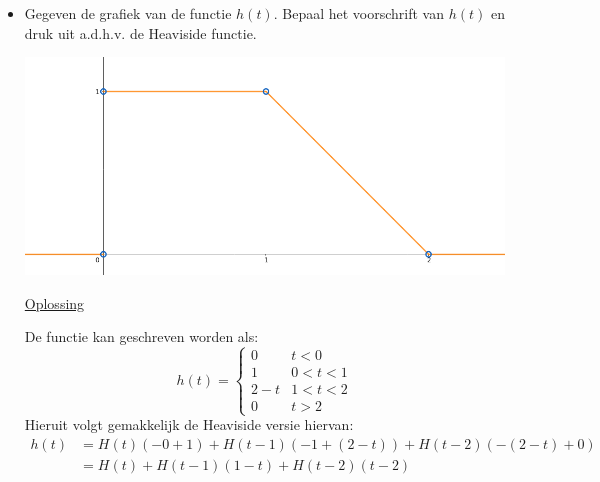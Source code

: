 \documentclass[12pt]{report}
\newcommand{\exercise}[2]{
  #1
  

  \underline{Oplossing}
  
  #2
  
  \hrulefill
}
\begin{document}
\begin{itemize}[label={}]
\item \exercise{Gegeven de grafiek van de functie $h(t)$. Bepaal het voorschrift van $h(t)$ en druk uit a.d.h.v. de Heaviside functie.
\begin{center}
 \includegraphics[width=\textwidth]{oef3_heaviside}
\end{center}}{
De functie kan geschreven worden als:
$$h(t) = \begin{cases}
          0 & t < 0 \\
          1 & 0 < t < 1 \\
          2 - t & 1 < t < 2 \\
          0 & t > 2
         \end{cases}
$$
Hieruit volgt gemakkelijk de Heaviside versie hiervan:
\begin{equation*}
 \begin{split}
  h(t) & = H(t)(-0 + 1) + H(t - 1)(-1 + (2 - t)) + H(t-2)(-(2-t) + 0) \\
       & = H(t) + H(t-1)(1 - t) + H(t- 2)(t - 2)
 \end{split}
\end{equation*}}

\end{itemize}
\end{document}
